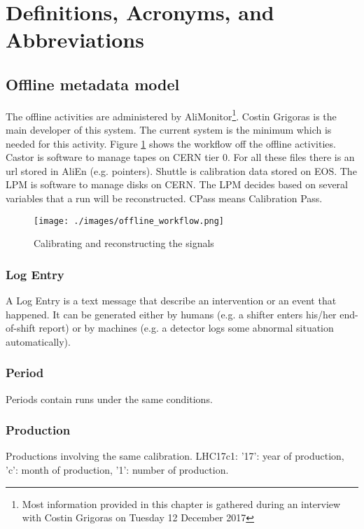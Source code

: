 \section{Definitions, Acronyms, and Abbreviations}

\subsection{Offline metadata model}
The offline activities are administered by AliMonitor\footnote{Most information provided in this chapter is gathered during an interview with Costin Grigoras on Tuesday 12 December 2017}. Costin Grigoras is the main developer of this system. The current system is the minimum which is needed for this activity. Figure \ref{fig:offlineWorkflow} shows the workflow off the offline activities. Castor is software to manage tapes on CERN tier 0. For all these files there is an url stored in AliEn (e.g. pointers). Shuttle is calibration data stored on EOS. The LPM is software to manage disks on CERN. The LPM decides based on several variables that a run will be reconstructed. CPass means Calibration Pass. 

\begin{figure}[h]
  \begin{center}
    \texttt{[image: ./images/offline\_workflow.png]}
    \caption{Calibrating and reconstructing the signals}
    \label{fig:offlineWorkflow}
  \end{center}
\end{figure}


\subsubsection{Log Entry}
A Log Entry is a text message that describe an intervention or an event that happened. It can be generated either by humans (e.g. a shifter enters his/her end-of-shift report) or by machines (e.g. a detector logs some abnormal situation automatically). 

\subsubsection{Period}
Periods contain runs under the same conditions.

\subsubsection{Production}
Productions involving the same calibration. LHC17c1: '17': year of production, 'c': month of production, '1': number of production.

